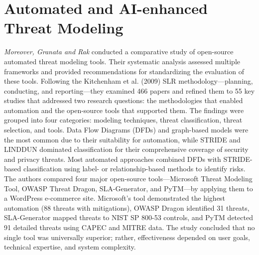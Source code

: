 \section{Automated and AI-enhanced Threat Modeling}

\textit{Moreover, Granata and Rak} conducted a comparative study of open-source automated threat modeling tools. Their systematic analysis assessed multiple frameworks and provided recommendations for standardizing the evaluation of these tools. Following the Kitchenham et al. (2009) SLR methodology—planning, conducting, and reporting—they examined 466 papers and refined them to 55 key studies that addressed two research questions: the methodologies that enabled automation and the open-source tools that supported them. The findings were grouped into four categories: modeling techniques, threat classification, threat selection, and tools. Data Flow Diagrams (DFDs) and graph-based models were the most common due to their suitability for automation, while STRIDE and LINDDUN dominated classification for their comprehensive coverage of security and privacy threats. Most automated approaches combined DFDs with STRIDE-based classification using label- or relationship-based methods to identify risks. The authors compared four major open-source tools—Microsoft Threat Modeling Tool, OWASP Threat Dragon, SLA-Generator, and PyTM—by applying them to a WordPress e-commerce site. Microsoft's tool demonstrated the highest automation (88 threats with mitigations), OWASP Dragon identified 31 threats, SLA-Generator mapped threats to NIST SP 800-53 controls, and PyTM detected 91 detailed threats using CAPEC and MITRE data. The study concluded that no single tool was universally superior; rather, effectiveness depended on user goals, technical expertise, and system complexity. \cite{granata2020}

